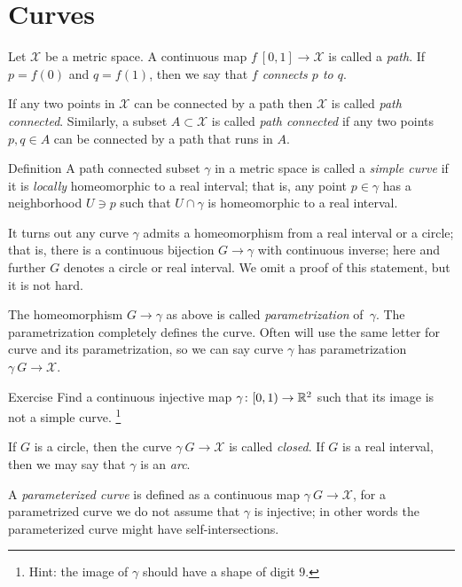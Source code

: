 \chapter{Curves}

Let $\mathcal{X}$ be a metric space.
A continuous map $f\:[0,1]\to\mathcal{X}$ is called a \emph{path}.
If $p=f(0)$ and $q=f(1)$, then we say that \emph{$f$ connects $p$ to $q$}.

If any two points in $\mathcal{X}$ can be connected by a path then $\mathcal{X}$ is called \emph{path connected}.
Similarly, a subset $A\subset \mathcal{X}$ is called \emph{path connected} if any two points $p,q\in A$ can be connected by a path that runs in $A$.

\begin{thm}{Definition} 
A path connected subset $\gamma$ in a metric space is called a \emph{simple curve} if it is \emph{locally} homeomorphic to a real interval; that is, any point $p\in\gamma$ has a neighborhood $U\ni p$ such that 
$U\cap \gamma$ is homeomorphic to a real interval.
\end{thm}

It turns out any curve $\gamma$ admits a homeomorphism from a real interval or a circle;
that is, there is a continuous bijection $G\to \gamma$ with continuous inverse;
here and further $G$ denotes a circle or real interval.
We omit a proof of this statement, but it is not hard.

The homeomorphism $G\to \gamma$ as above is called \emph{parametrization} of~$\gamma$.
The parametrization completely defines the curve.
Often will use the same letter for curve and its parametrization, so we can say curve $\gamma$ has parametrization $\gamma\:G\to \mathcal{X}$.

\begin{thm}{Exercise}
Find a continuous injective map $\gamma\colon[0,1)\to\mathbb{R}^2$ such that its image is not a simple curve.%
\footnote{Hint: the image of $\gamma$ should have a shape of digit $9$.}
\end{thm}



If $G$ is a circle, then the curve $\gamma\:G\to \mathcal{X}$ is called \emph{closed}.
If $G$ is a real interval, then  we may say that $\gamma$ is an \emph{arc}.

A \emph{parameterized curve} is defined as a continuous map $\gamma\: G\to \mathcal{X}$, for a parametrized curve we do not assume that $\gamma$ is injective; in other words the parameterized curve might have self-intersections.

